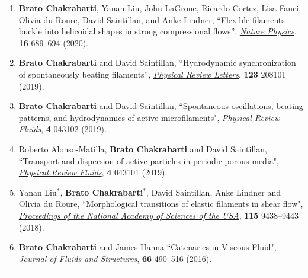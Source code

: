 \documentclass[10pt]{res} %
\begin{document}
\begin{resume}
\begin{enumerate}[topsep=0pt,itemsep= 1ex]
\item \textbf{Brato Chakrabarti}, Yanan Liu, John LaGrone, Ricardo Cortez, Lisa Fauci, Olivia du Roure, David Saintillan, and Anke Lindner, ``Flexible filaments buckle into helicoidal shapes in strong compressional flows'',  \href{https://doi.org/10.1038/s41567-020-0843-7}{\textit{Nature Physics}}, \textbf{16} 689--694 (2020).

\item \textbf{Brato Chakrabarti} and David Saintillan, ``Hydrodynamic synchronization of spontaneously beating filaments'', \href{https://doi.org/10.1103/PhysRevLett.123.208101}{\textit{Physical Review Letters}}, \textbf{123} 208101 (2019). 


\item \textbf{Brato Chakrabarti} and David Saintillan, ``Spontaneous oscillations, beating patterns, and hydrodynamics of active microfilaments", \href{https://doi.org/10.1103/PhysRevFluids.4.043102}{\textit{Physical Review Fluids}}, \textbf{4} 043102 (2019). 


\item Roberto Alonso-Matilla, \textbf{Brato Chakrabarti} and David Saintillan, ``Transport and dispersion of active particles in periodic porous media", \href{https://doi.org/10.1103/PhysRevFluids.4.043101}{\textit{Physical Review Fluids}}, \textbf{4} 043101 (2019). 

\item Yanan Liu$^*$, \textbf{Brato Chakrabarti}$^*$, David Saintillan, Anke Lindner and Olivia du Roure, ``Morphological transitions of elastic filaments in shear flow", \href{https://doi.org/10.1073/pnas.1805399115}{\textit{Proceedings of the National Academy of Sciences of the USA}}, \textbf{115} 9438--9443 (2018).


\item \textbf{Brato Chakrabarti} and James Hanna ``Catenaries in Viscous Fluid", \href{https://doi.org/10.1016/j.jfluidstructs.2016.04.009}{\textit{Journal of Fluids and Structures}}, \textbf{66} 490–516 (2016).
\end{enumerate}


\vspace*{-2mm}
\noindent\rule{\textwidth}{0.6pt}
\vspace*{-10mm}
\section{} 
\vspace*{8mm}
\begin{enumerate}
	

\end{enumerate}
\end{resume}
\end{document}
